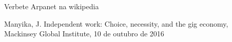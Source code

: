 \documentclass[
12pt,		%
openright,	%
twoside,  %
a4paper,			%
chapter=TITLE,		%
english,			%
french,				%
spanish,			%
brazil				%
]{USPSC-classe/USPSC}
\begin{document}
\begin{flushleft}
\begin{flushleft}
\begin{flushleft}
\begin{flushleft}
\begin{flushleft}
\begin{flushleft}
\begin{flushleft}
\begin{flushleft}
[ARPANET, 2022] Verbete Arpanet na wikipedia
\end{flushleft}


\end{flushleft}


\end{flushleft}


\end{flushleft}


\end{flushleft}


\end{flushleft}


\end{flushleft}


\end{flushleft}


\begin{flushleft}
\begin{flushleft}
\begin{flushleft}
\begin{flushleft}
\begin{flushleft}
\begin{flushleft}
\begin{flushleft}
\begin{flushleft}
[Manyika, 2016] Manyika, J. Independent work: Choice, necessity, and the gig economy, Mackinsey Global Institute, 10 de outubro de 2016
\end{flushleft}


\end{flushleft}


\end{flushleft}


\end{flushleft}


\end{flushleft}


\end{flushleft}


\end{flushleft}


\end{flushleft}
\end{document}
